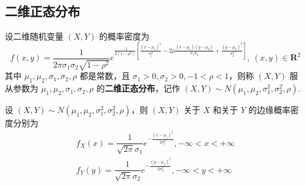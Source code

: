 \subsection{二维正态分布}

设二维随机变量 $(X,Y)$ 的概率密度为
$$
f(x,y) = \dfrac{1}{2 \pi \sigma_1 \sigma_2 \sqrt{1-\rho^2}} e^{\frac{-1}{2(1-\rho^2)} \left[ \frac{(x-\mu_1)^2}{\sigma_1^2} - 2 \rho \frac{(x-\mu_1)(y-\mu_2)}{\sigma_1 \sigma_2} + \frac{(y-\mu_2)^2}{\sigma_2^2} \right]},\ (x,y)\in \mathbf{R}^2
$$
其中 $\mu_1,\mu_2,\sigma_1,\sigma_2,\rho$ 都是常数，且 $\sigma_1 > 0, \sigma_2 > 0, -1 < \rho < 1$，则称 $(X,Y)$ 服从参数为 $\mu_1,\mu_2,\sigma_1,\sigma_2,\rho$ 的\textbf{二维正态分布}，记作 $(X,Y) \sim N(\mu_1,\mu_2,\sigma_1^2,\sigma_2^2,\rho)$.

\begin{conclusion}
    设 $(X,Y) \sim N(\mu_1,\mu_2,\sigma_1^2,\sigma_2^2,\rho)$，则 $(X,Y)$ 关于 $X$ 和关于 $Y$ 的边缘概率密度分别为
    \begin{gather*}
        f_{X}(x) = \dfrac{1}{\sqrt{2\pi} \sigma_1} e^{-\frac{(x-\mu_1)^2}{2 \sigma_1^2}}, -\infty < x < +\infty \\
        f_{Y}(y) = \dfrac{1}{\sqrt{2\pi} \sigma_2} e^{-\frac{(y-\mu_2)^2}{2 \sigma_2^2}}, -\infty < y < +\infty
    \end{gather*}
\end{conclusion}

